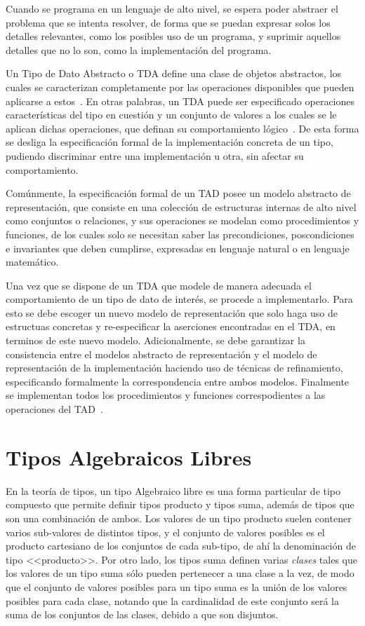 Cuando se programa en un lenguaje de alto nivel, se espera poder abstraer el
problema que se intenta resolver, de forma que se puedan expresar solos los
detalles relevantes, como los posibles uso de un programa, y suprimir aquellos
detalles que no lo son, como la implementación del programa.

Un Tipo de Dato Abstracto o TDA define una clase de objetos abstractos, los
cuales se caracterizan completamente por las operaciones disponibles que
pueden aplicarse a estos~\cite{liskov}. En otras palabras, un TDA puede ser
especificado operaciones características del tipo en cuestión y un conjunto de
valores a los cuales se le aplican dichas operaciones, que definan su
comportamiento lógico~\cite{dalewalker}. De esta forma se desliga la
especificación formal de la implementación concreta de un tipo, pudiendo
discriminar entre una implementación u otra, sin afectar su comportamiento.

Comúnmente, la especificación formal de un TAD posee un modelo abstracto de
representación, que consiste en una colección de estructuras internas de alto
nivel como conjuntos o relaciones, y sus operaciones se modelan como
procedimientos y funciones, de los cuales solo se necesitan saber las
precondiciones, poscondiciones e invariantes que deben cumplirse, expresadas
en lenguaje natural o en lenguaje matemático.

Una vez que se dispone de un TDA que modele de manera adecuada el
comportamiento de un tipo de dato de interés, se procede a implementarlo. Para
esto se debe escoger un nuevo modelo de representación que solo haga uso de
estructuas concretas y re-especificar la aserciones encontradas en el TDA, en
terminos de este nuevo modelo. Adicionalmente, se debe garantizar la
consistencia entre el modelos abstracto de representación y el modelo de
representación de la implementación haciendo uso de técnicas de refinamiento,
especificando formalmente la correspondencia entre ambos modelos. Finalmente
se implementan todos los procedimientos y funciones correspodientes a las
operaciones del TAD~\cite{ravelo}.




\section{Tipos Algebraicos Libres}


En la teoría de tipos, un tipo Algebraico libre es una forma particular de tipo
compuesto que permite definir tipos producto y tipos suma, además de tipos que
son una combinación de ambos. Los valores de un tipo producto suelen contener
varios sub-valores de distintos tipos, y el conjunto de valores posibles es el
producto cartesiano de los conjuntos de cada sub-tipo, de ahí la denominación de
tipo <<producto>>. Por otro lado, los tipos suma definen varias \textit{clases}
tales que  los valores de un tipo suma sólo pueden pertenecer a una clase a la
vez, de modo que el conjunto de valores posibles para un tipo suma es la unión
de los valores posibles para cada clase, notando que la cardinalidad de este
conjunto será la suma de los conjuntos de las clases, debido a que son
disjuntos.

